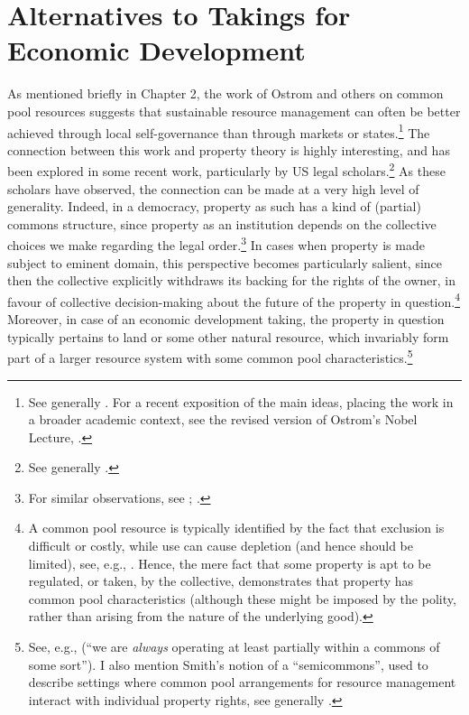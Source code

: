 \section{Alternatives to Takings for Economic Development}\label{sec:lad}

As mentioned briefly in Chapter 2, the work of Ostrom and others on common pool resources suggests that sustainable resource management can often be better achieved through local self-governance than through markets or states.\footnote{See generally \cite{ostrom90}. For a recent exposition of the main ideas, placing the work in a broader academic context, see the revised version of Ostrom's Nobel Lecture, \cite{ostrom10}.} The connection between this work and property theory is highly interesting, and has been explored in some recent work, particularly by US legal scholars.\footnote{See generally \cite{rose11,fennel11}.} As these scholars have observed, the connection can be made at a very high level of generality. Indeed, in a democracy, property as such has a kind of (partial) commons structure, since property as an institution depends on the collective choices we make regarding the legal order.\footnote{For similar observations, see \cite[51]{rose90}; \cite[577]{heller01}.} In cases when property is made subject to eminent domain, this perspective becomes particularly salient, since then the collective explicitly withdraws its backing for the rights of the owner, in favour of collective decision-making about the future of the property in question.\footnote{A common pool resource is typically identified by the fact that exclusion is difficult or costly, while use can cause depletion (and hence should be limited), see, e.g., \cite[57]{ostrom10b}. Hence, the mere fact that some property is apt to be regulated, or taken, by the collective, demonstrates that property has common pool characteristics (although these might be imposed by the polity, rather than arising from the nature of the underlying good).} Moreover, in case of an economic development taking, the property in question typically pertains to land or some other natural resource, which invariably form part of a larger resource system with some common pool characteristics.\footnote{See, e.g., \cite[16]{fennel11} (``we are {\it always} operating at least partially within a commons of some sort''). I also mention Smith's notion of a ``semicommons'', used to describe settings where common pool arrangements for resource management interact with individual property rights, see generally \cite{smith00,smith02}.}

